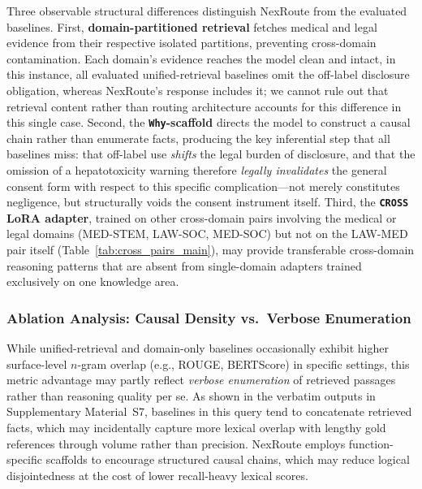 \documentclass[a4paper,fleql]{cas-sc}
\begin{document}
Three observable structural differences distinguish NexRoute from the evaluated baselines. First, \textbf{domain-partitioned retrieval} fetches medical and legal
evidence from their respective isolated partitions, preventing cross-domain
contamination. Each domain's evidence reaches the model clean and intact,
in this instance, all evaluated unified-retrieval baselines omit the
off-label disclosure obligation, whereas NexRoute's response includes it;
we cannot rule out that retrieval content rather than routing architecture
accounts for this difference in this single case. Second, the \textbf{\texttt{Why}-scaffold} directs the
model to construct a causal chain rather than enumerate facts, producing the
key inferential step that all baselines miss: that off-label use \emph{shifts}
the legal burden of disclosure, and that the omission of a hepatotoxicity
warning therefore \emph{legally invalidates} the general consent form with
respect to this specific complication---not merely constitutes negligence, but
structurally voids the consent instrument itself. Third, the
\textbf{\texttt{CROSS} LoRA adapter}, trained on other cross-domain pairs
involving the medical or legal domains (MED-STEM, LAW-SOC, MED-SOC) but not
on the LAW-MED pair itself (Table~\ref{tab:cross_pairs_main}), may provide
transferable cross-domain reasoning patterns that are absent from
single-domain adapters trained exclusively on one knowledge area.

\subsubsection{Ablation Analysis: Causal Density vs.\ Verbose Enumeration}
\label{sssec:causal-density}
While unified-retrieval and domain-only baselines occasionally exhibit higher
surface-level $n$-gram overlap (e.g., ROUGE, BERTScore) in specific settings,
this metric advantage may partly reflect \textit{verbose enumeration} of
retrieved passages rather than reasoning quality per se. As shown in the verbatim outputs in Supplementary Material~S7, baselines in this query
tend to concatenate retrieved facts, which may incidentally capture more
lexical overlap with lengthy gold references through volume rather than
precision. NexRoute employs function-specific scaffolds to encourage structured
causal chains, which may reduce logical disjointedness at the cost of lower
recall-heavy lexical scores.
\end{document}
